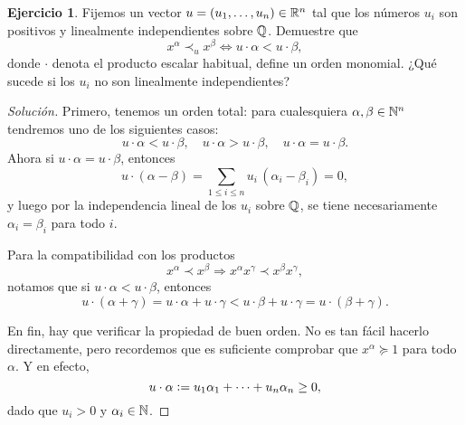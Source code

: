 \documentclass{article}
\theoremstyle{definition}
\newtheorem{ejerc}{Ejercicio}
\newenvironment{solucion}{\begin{proof}[Solución]}{\end{proof}}
\begin{document}
\begin{ejerc}
  Fijemos un vector $u = (u_1,\ldots,u_n) \in \mathbb{R}^n$ tal que los números $u_i$
  son positivos y linealmente independientes sobre $\mathbb{Q}$. Demuestre que
  $$x^\alpha \prec_u x^\beta \iff u\cdot \alpha < u\cdot \beta,$$
  donde $\cdot$ denota el producto escalar habitual, define un orden
  monomial. ¿Qué sucede si los $u_i$ no son linealmente independientes?

  \ifdefined\solutions\begin{solucion}
    Primero, tenemos un orden total: para cualesquiera $\alpha,\beta \in \mathbb{N}^n$
    tendremos uno de los siguientes casos:
    \[ u\cdot \alpha < u\cdot \beta, \quad
       u\cdot \alpha > u\cdot \beta, \quad
       u\cdot \alpha = u\cdot \beta. \]
    Ahora si $u\cdot \alpha = u\cdot \beta$, entonces
    $$u\cdot (\alpha-\beta) = \sum_{1 \le i \le n} u_i\,(\alpha_i - \beta_i) = 0,$$
    y luego por la independencia lineal de los $u_i$ sobre $\mathbb{Q}$, se tiene
    necesariamente $\alpha_i = \beta_i$ para todo $i$.

    Para la compatibilidad con los productos
    $$x^\alpha \prec x^\beta \Longrightarrow x^\alpha x^\gamma \prec x^\beta x^\gamma,$$
    notamos que si $u\cdot\alpha < u\cdot\beta$, entonces
    \[ u\cdot (\alpha+\gamma) =
       u\cdot\alpha + u\cdot\gamma <
       u\cdot\beta + u\cdot\gamma =
       u\cdot (\beta+\gamma). \]

     En fin, hay que verificar la propiedad de buen orden. No es tan fácil
     hacerlo directamente, pero recordemos que es suficiente comprobar que
     $x^\alpha \succeq 1$ para todo $\alpha$. Y en efecto,
     $$u\cdot \alpha \mathrel{\mathop:}= u_1 \alpha_1 + \cdots + u_n \alpha_n \ge 0,$$
     dado que $u_i > 0$ y $\alpha_i \in \mathbb{N}$.
   \end{solucion}\fi
\end{ejerc}
\end{document}
